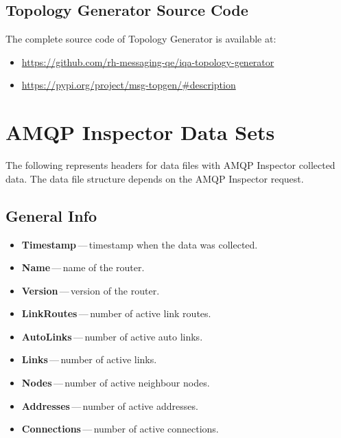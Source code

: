 \section*{Topology Generator Source Code}
\label{AP:Topology Generator Source Code}
The complete source code of Topology Generator is available at:
\begin{itemize}
  \item \url{https://github.com/rh-messaging-qe/iqa-topology-generator}
  \item \url{https://pypi.org/project/msg-topgen/#description}
\end{itemize}


\chapter{AMQP Inspector Data Sets}
\label{AMQP Inspector Data Sets}
The following represents headers for data files with AMQP Inspector collected data. The data file structure depends on the AMQP Inspector request.

\section*{General Info}
\begin{itemize}
  \setlength\itemsep{0em}
  \item \textbf{Timestamp}\,---\,timestamp when the data was collected.
  \item \textbf{Name}\,---\,name of the router.
  \item \textbf{Version}\,---\,version of the router.
  \item \textbf{LinkRoutes}\,---\,number of active link routes.
  \item \textbf{AutoLinks}\,---\,number of active auto links.
  \item \textbf{Links}\,---\,number of active links.
  \item \textbf{Nodes}\,---\,number of active neighbour nodes.
  \item \textbf{Addresses}\,---\,number of active addresses.
  \item \textbf{Connections}\,---\,number of active connections.
\end{itemize}

